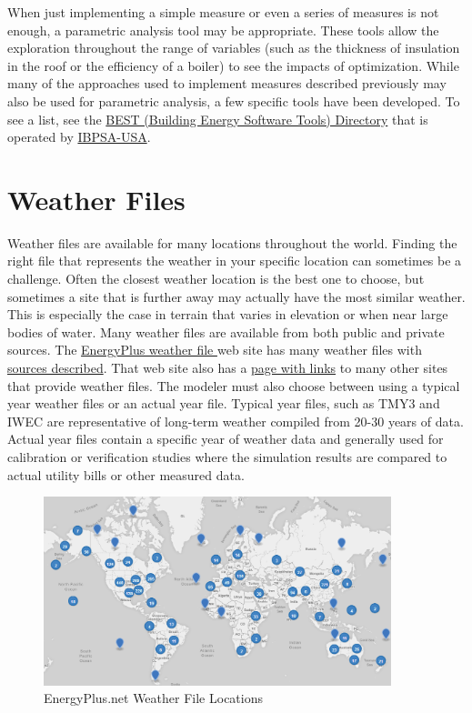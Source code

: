 When just implementing a simple measure or even a series of measures
is not enough, a parametric analysis tool may be appropriate. These
tools allow the exploration throughout the range of variables (such
as the thickness of insulation in the roof or the efficiency of a
boiler) to see the impacts of optimization. While many of the approaches
used to implement measures described previously may also be used for
parametric analysis, a few specific tools have been developed. To
see a list, see the \href{https://www.buildingenergysoftwaretools.com/}{BEST (Building Energy Software Tools) Directory}
that is operated by \href{https://www.ibpsa.us/}{IBPSA-USA}.

\section{Weather Files \label{subsec:Weather-Files}}

Weather files are available for many locations throughout the world.
Finding the right file that represents the weather in your specific
location can sometimes be a challenge. Often the closest weather location
is the best one to choose, but sometimes a site that is further away
may actually have the most similar weather. This is especially the
case in terrain that varies in elevation or when near large bodies
of water. Many weather files are available from both public and private
sources. The \href{https://energyplus.net/weather}{EnergyPlus weather file }
web site has many weather files with \href{https://energyplus.net/weather/sources}{sources described}.
That web site also has a \href{https://energyplus.net/weather/simulation}{page with links}
to many other sites that provide weather files. The modeler must also
choose between using a typical year weather files or an actual year
file. Typical year files, such as TMY3 and IWEC are representative
of long-term weather compiled from 20-30 years of data. Actual year
files contain a specific year of weather data and generally used for
calibration or verification studies where the simulation results are
compared to actual utility bills or other measured data.

\begin{figure}[hbtp] 
\centering
\includegraphics[width=0.9\textwidth, height=0.9\textheight, keepaspectratio=true]{media/WeatherFileLocations.png}
\caption{EnergyPlus.net Weather File Locations}
\end{figure}

